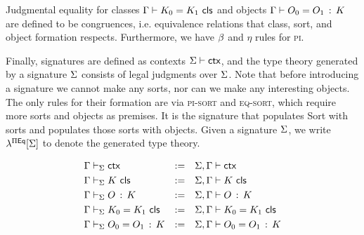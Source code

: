 Judgmental equality for classes $\Gamma \vdash K_{0} = K_{1} \,\, \mathsf{cls}$ and objects
$\Gamma \vdash O_{0} = O_{1} \, : \, K$ are defined to be congruences,
i.e. equivalence relations that class,
sort, and object formation respects.
Furthermore, we have $\beta$ and $\eta$ rules for \textsc{pi}.

Finally, signatures are defined as contexts $\Sigma \vdash \mathsf{ctx}$,
and the type theory generated by a signature $\Sigma$ consists of
legal judgments over $\Sigma$.
Note that before introducing a signature we cannot make any sorts,
nor can we make any interesting objects.
The only rules for their formation are via \textsc{pi-sort} and \textsc{eq-sort},
which require more sorts and objects as premises.
It is the signature that populates \textsf{Sort} with sorts
and populates those sorts with objects.
Given a signature $\Sigma$, we write $\lambda^{\Pi \mathsf{Eq}}[\Sigma]$ to denote the
generated type theory.

\begin{align*}
  &\Gamma \vdash_\Sigma \mathsf{ctx} & :=
  & & & \Sigma,\Gamma \vdash \mathsf{ctx} \\
  &\Gamma \vdash_\Sigma K \,\, \mathsf{cls} & :=
  & & & \Sigma,\Gamma \vdash K \,\, \mathsf{cls} \\
  &\Gamma \vdash_\Sigma O \, : \, K & :=
  & & & \Sigma,\Gamma \vdash O \, : \, K \\
  &\Gamma \vdash_\Sigma K_{0} = K_{1} \,\, \mathsf{cls} & :=
  & & & \Sigma,\Gamma \vdash K_{0} = K_{1} \,\, \mathsf{cls} \\
  &\Gamma \vdash_\Sigma O_{0} = O_{1} \, : \, K & :=
  & & & \Sigma,\Gamma \vdash O_{0} = O_{1} \, : \, K
\end{align*}
